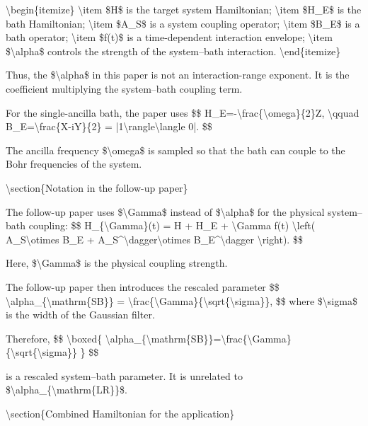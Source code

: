 {\textbackslash{}begin\{itemize\}
    \textbackslash{}item \$H\$ is the target system Hamiltonian;
    \textbackslash{}item \$H\_E\$ is the bath Hamiltonian;
    \textbackslash{}item \$A\_S\$ is a system coupling operator;
    \textbackslash{}item \$B\_E\$ is a bath operator;
    \textbackslash{}item \$f(t)\$ is a time-dependent interaction envelope;
    \textbackslash{}item \$\textbackslash{}alpha\$ controls the strength of the system--bath interaction.
\textbackslash{}end\{itemize\}

Thus, the \$\textbackslash{}alpha\$ in this paper is not an interaction-range exponent.
It is the coefficient multiplying the system--bath coupling term.

For the single-ancilla bath, the paper uses
\$\$
H\_E=-\textbackslash{}frac\{\textbackslash{}omega\}\{2\}Z,
\textbackslash{}qquad
B\_E=\textbackslash{}frac\{X-iY\}\{2\}
=
|1\textbackslash{}rangle\textbackslash{}langle 0|.
\$\$

The ancilla frequency \$\textbackslash{}omega\$ is sampled so that the bath can couple to
the Bohr frequencies of the system.

\textbackslash{}section\{Notation in the follow-up paper\}

The follow-up paper uses \$\textbackslash{}Gamma\$ instead of \$\textbackslash{}alpha\$ for the physical
system--bath coupling:
\$\$
H\_\{\textbackslash{}Gamma\}(t)
=
H
+
H\_E
+
\textbackslash{}Gamma f(t)
\textbackslash{}left(
A\_S\textbackslash{}otimes B\_E
+
A\_S\textasciicircum{}\textbackslash{}dagger\textbackslash{}otimes B\_E\textasciicircum{}\textbackslash{}dagger
\textbackslash{}right).
\$\$

Here, \$\textbackslash{}Gamma\$ is the physical coupling strength.

The follow-up paper then introduces the rescaled parameter
\$\$
\textbackslash{}alpha\_\{\textbackslash{}mathrm\{SB\}\}
=
\textbackslash{}frac\{\textbackslash{}Gamma\}\{\textbackslash{}sqrt\{\textbackslash{}sigma\}\},
\$\$
where \$\textbackslash{}sigma\$ is the width of the Gaussian filter.

Therefore,
\$\$
\textbackslash{}boxed\{
\textbackslash{}alpha\_\{\textbackslash{}mathrm\{SB\}\}=\textbackslash{}frac\{\textbackslash{}Gamma\}\{\textbackslash{}sqrt\{\textbackslash{}sigma\}\}
\}
\$\$

is a rescaled system--bath parameter. It is unrelated to
\$\textbackslash{}alpha\_\{\textbackslash{}mathrm\{LR\}\}\$.

\textbackslash{}section\{Combined Hamiltonian for the application\}

}
